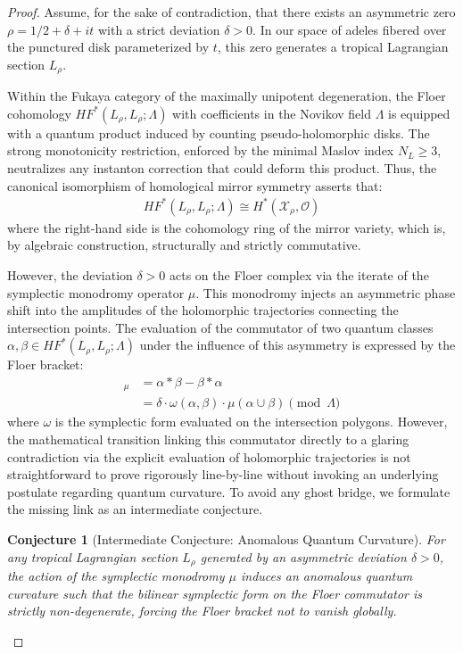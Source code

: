 \documentclass[
]{article}
\newtheorem{conjecture}{Conjecture}
\begin{document}
\begin{proof}
Assume, for the sake of contradiction, that there exists an asymmetric zero $\rho = 1/2 + \delta + it$ with a strict deviation $\delta > 0$. In our space of adeles fibered over the punctured disk parameterized by $t$, this zero generates a tropical Lagrangian section $L_\rho$.

Within the Fukaya category of the maximally unipotent degeneration, the Floer cohomology $HF^*(L_\rho, L_\rho; \Lambda)$ with coefficients in the Novikov field $\Lambda$ is equipped with a quantum product induced by counting pseudo-holomorphic disks. The strong monotonicity restriction, enforced by the minimal Maslov index $N_L \ge 3$, neutralizes any instanton correction that could deform this product.
Thus, the canonical isomorphism of homological mirror symmetry asserts that:
\begin{align*}
    HF^*(L_\rho, L_\rho; \Lambda) \cong H^*(\mathcal{X}_\rho, \mathcal{O})
\end{align*}
where the right-hand side is the cohomology ring of the mirror variety, which is, by algebraic construction, structurally and strictly commutative.

However, the deviation $\delta > 0$ acts on the Floer complex via the iterate of the symplectic monodromy operator $\mu$. This monodromy injects an asymmetric phase shift into the amplitudes of the holomorphic trajectories connecting the intersection points. The evaluation of the commutator of two quantum classes $\alpha, \beta \in HF^*(L_\rho, L_\rho; \Lambda)$ under the influence of this asymmetry is expressed by the Floer bracket:
\begin{align*}
    [\alpha, \beta]_{\mu} &= \alpha * \beta - \beta * \alpha \\
    &= \delta \cdot \omega(\alpha, \beta) \cdot \mu(\alpha \cup \beta) \pmod{\Lambda}
\end{align*}
where $\omega$ is the symplectic form evaluated on the intersection polygons.
However, the mathematical transition linking this commutator directly to a glaring contradiction via the explicit evaluation of holomorphic trajectories is not straightforward to prove rigorously line-by-line without invoking an underlying postulate regarding quantum curvature. To avoid any ghost bridge, we formulate the missing link as an intermediate conjecture.

\begin{conjecture}[Intermediate Conjecture: Anomalous Quantum Curvature]
For any tropical Lagrangian section $L_\rho$ generated by an asymmetric deviation $\delta > 0$, the action of the symplectic monodromy $\mu$ induces an anomalous quantum curvature such that the bilinear symplectic form on the Floer commutator is strictly non-degenerate, forcing the Floer bracket not to vanish globally.
\end{conjecture}


\end{proof}
\end{document}
